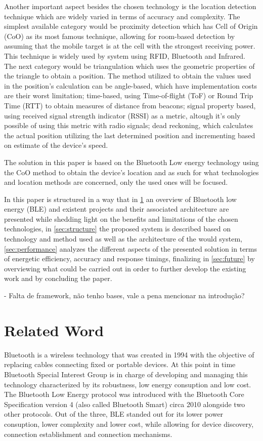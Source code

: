 \documentclass[a4paper]{IEEEtran}
\begin{document}
Another important aspect besides the chosen technology is the location detection technique which are widely varied in terms of accuracy and complexity. The simplest available category would be proximity detection which has Cell of Origin (CoO) as its most famous technique, allowing for room-based detection by assuming that the mobile target is at the cell with the strongest receiving power. This technique is widely used by system using RFID, Bluetooth and Infrared. The next category would be triangulation which uses the geometric properties of the triangle to obtain a position. The method utilized to obtain the values used in the position's calculation can be angle-based, which have implementation costs are their worst limitation; time-based, using Time-of-flight (ToF) or Round Trip Time (RTT) to obtain measures of distance from beacons; signal property based, using received signal strength indicator (RSSI) as a metric, altough it's only possible of using this metric with radio signals; dead reckoning, which calculates the actual position utilizing the last determined position and incrementing based on estimate of the device's speed.

The solution in this paper is based on the Bluetooth Low energy technology using the CoO method to obtain the device's location and as such for what technologies and location methods are concerned, only the used ones will be focused. 

In this paper is structured in a way that in \ref{sec:related} an overview of Bluetooth low energy (BLE) and existent projects and their associated architecture are presented while shedding light on the benefits and limitations of the chosen technologies, in \ref{sec:structure} the proposed system is described based on technology and method used as well as the architecture of the would system, \ref{sec:performance} analyzes the different aspects of the presented solution in terms of energetic efficiency, accuracy and response timings, finalizing in \ref{sec:future} by overviewing what could be carried out in order to further develop the existing work and by concluding the paper.


- Falta de framework, não tenho bases, vale a pena mencionar na introdução?

\section{Related Word}
\label{sec:related}

Bluetooth is a wireless technology that was created in 1994 with the objective of replacing cables connecting fixed or portable devices. At this point in time Bluetooth Special Interest Group is in charge of developing and managing this technology characterized by its robustness, low energy consuption and low cost. The Bluetooth Low Energy protocol was introduced with the Bluetooth Core Specification version 4 (also called Bluetooth Smart) circa 2010 alongside two other protocols.  Out of the three, BLE standed out for its lower power consuption, lower complexity and lower cost, while allowing for  device discovery, connection establishment and connection mechanisms. 
\end{document}
